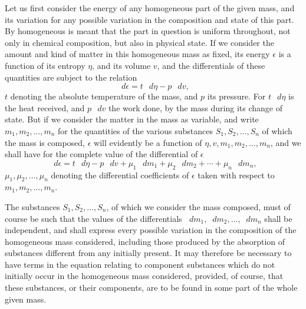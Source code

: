 \documentclass[11pt]{article}
\newcommand{\dd}{\mathop{}\!d}
\newcommand{\eps}{\epsilon}
\begin{document}
Let us first consider the energy of any homogeneous part of the given mass, and its variation for any possible variation in the composition and state of this part. By homogeneous is meant that the part in question is uniform throughout, not only in chemical composition, but also in physical state. If we consider the amount and kind of matter in this homogeneous mass as fixed, its energy \(\eps\) is a function of its entropy \(\eta\), and its volume \(v\), and the differentials of these quantities are subject to the relation
\begin{equation}
\dd\eps = t\,\dd\eta - p\,\dd v,
\end{equation}
\(t\) denoting the absolute temperature of the mass, and \(p\) its pressure. For \(t\,\dd\eta\) is the heat received, and \(p\,\dd v\) the work done, by the mass during its change of state. But if we consider the matter in the mass as variable, and write \(m_1,m_2,\ldots,m_n\) for the quantities of the various substances \(S_1,S_2,\ldots,S_n\) of which the mass is composed, \(\eps\) will evidently be a function of \(\eta,v,m_1,m_2,\ldots,m_n\), and we shall have for the complete value of the differential of \(\eps\)
\begin{equation}
\dd\eps
= t\,\dd\eta - p\,\dd v
  + \mu_1\,\dd m_1 + \mu_2\,\dd m_2 + \cdots + \mu_n\,\dd m_n,
\end{equation}
\(\mu_1,\mu_2,\ldots,\mu_n\) denoting the differential coefficients of \(\eps\) taken with respect to \(m_1,m_2,\ldots,m_n\).

The substances \(S_1,S_2,\ldots,S_n\), of which we consider the mass composed, must of course be such that the values of the differentials \(\dd m_1,\dd m_2,\ldots,\dd m_n\) shall be independent, and shall express every possible variation in the composition of the homogeneous mass considered, including those produced by the absorption of substances different from any initially present. It may therefore be necessary to have terms in the equation relating to component substances which do not initially occur in the homogeneous mass considered, provided, of course, that these substances, or their components, are to be found in some part of the whole given mass.
\end{document}
